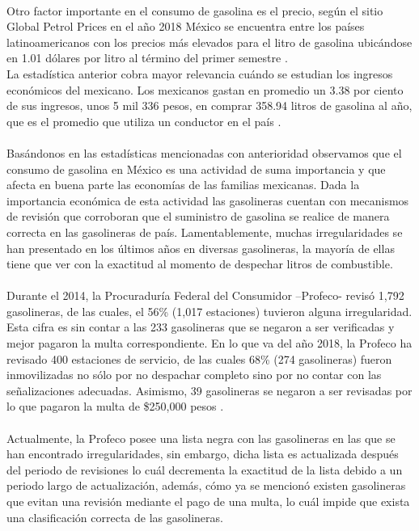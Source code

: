 \paragraph{}
Otro factor importante en el consumo de gasolina es el precio, según el sitio Global Petrol Prices en el año 2018 México se encuentra entre los países latinoamericanos con los precios más elevados para el litro de gasolina ubicándose en 1.01 dólares por litro al término del primer semestre \citep{Pre3}.
\\
La estadística anterior cobra mayor relevancia cuándo se estudian los ingresos económicos del mexicano. Los mexicanos gastan en promedio un 3.38 por ciento de sus ingresos, unos 5 mil 336 pesos, en comprar 358.94 litros de gasolina al año, que es el promedio que utiliza un conductor en el país \citep{Pre4}.
\paragraph{}
Basándonos en las estadísticas mencionadas con anterioridad observamos que el consumo de gasolina en México es una actividad de suma importancia y que afecta en buena parte las economías de las familias mexicanas. Dada la importancia económica de esta actividad las gasolineras cuentan con mecanismos de revisión que corroboran que el suministro de gasolina se realice de manera correcta en las gasolineras de país. Lamentablemente, muchas irregularidades se han presentado en los últimos años en diversas gasolineras, la mayoría de ellas tiene que ver con la exactitud al momento de despechar litros de combustible.
\paragraph{}
Durante el 2014, la Procuraduría Federal del Consumidor –Profeco- revisó 1,792 gasolineras, de las cuales, el 56\% (1,017 estaciones) tuvieron alguna irregularidad. Esta cifra es sin contar a las 233 gasolineras que se negaron a ser verificadas y mejor pagaron la multa correspondiente.
En lo que va del año 2018, la Profeco ha revisado 400 estaciones de servicio, de las cuales 68\% (274 gasolineras) fueron inmovilizadas no sólo por no despachar completo sino por no contar con las señalizaciones adecuadas. Asimismo, 39 gasolineras se negaron a ser revisadas por lo que pagaron la multa de \$250,000 pesos \citep{Pre5}.
\paragraph{}
Actualmente, la Profeco posee una lista negra con las gasolineras en las que se han encontrado irregularidades, sin embargo, dicha lista es actualizada después del periodo de revisiones lo cuál decrementa la exactitud de la lista debido a un periodo largo de actualización, además, cómo ya se mencionó existen gasolineras que evitan una revisión mediante el pago de una multa, lo cuál impide que exista una clasificación correcta de las gasolineras.
